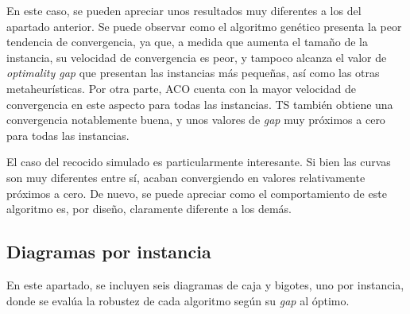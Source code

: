 En este caso, se pueden apreciar unos resultados muy diferentes a los del apartado anterior. Se puede observar como el 
algoritmo genético presenta la peor tendencia de convergencia, ya que, a medida que aumenta el tamaño de la instancia, su 
velocidad de convergencia es peor, y tampoco alcanza el valor de \textit{optimality gap} que presentan las instancias más
pequeñas, así como las otras metaheurísticas. Por otra parte, ACO cuenta con la mayor velocidad de convergencia en este 
aspecto para todas las instancias. TS también obtiene una convergencia notablemente buena, y unos valores de \textit{gap}
muy próximos a cero para todas las instancias.

El caso del recocido simulado es particularmente interesante. Si bien las curvas son muy diferentes entre sí, acaban 
convergiendo en valores relativamente próximos a cero. De nuevo, se puede apreciar como el comportamiento de este algoritmo
es, por diseño, claramente diferente a los demás.

\newpage

\subsection{Diagramas por instancia}
\label{subsec:boxplot_inst}

En este apartado, se incluyen seis diagramas de caja y bigotes, uno por instancia, donde se evalúa la robustez de cada 
algoritmo según su \textit{gap} al óptimo.

